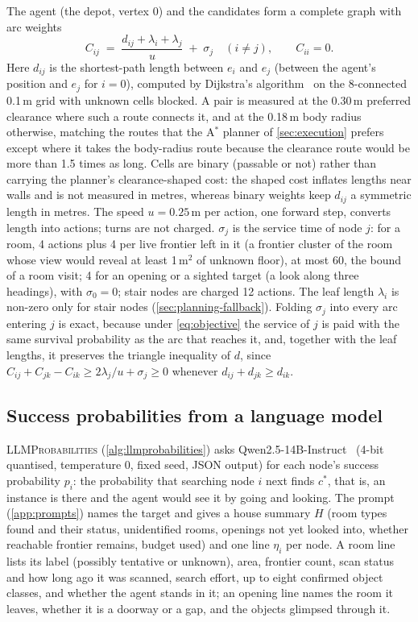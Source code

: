 \documentclass[10pt]{article}
\newcommand{\cstar}{c^{*}}
\begin{document}
The agent (the depot, vertex $0$) and the candidates form a complete graph with arc weights
\begin{equation}
  C_{ij} \;=\; \frac{d_{ij}+\lambda_i+\lambda_j}{u} \;+\; \sigma_j \quad (i\neq j), \qquad C_{ii}=0 .
  \label{eq:arccost}
\end{equation}
Here $d_{ij}$ is the shortest-path length between $e_i$ and $e_j$ (between the agent's position and $e_j$ for $i=0$), computed by Dijkstra's algorithm~\citep{dijkstra1959note} on the 8-connected 0.1\,m grid with unknown cells blocked. A pair is measured at the 0.30\,m preferred clearance where such a route connects it, and at the 0.18\,m body radius otherwise, matching the routes that the A$^*$ planner of \cref{sec:execution} prefers except where it takes the body-radius route because the clearance route would be more than 1.5 times as long. Cells are binary (passable or not) rather than carrying the planner's clearance-shaped cost: the shaped cost inflates lengths near walls and is not measured in metres, whereas binary weights keep $d_{ij}$ a symmetric length in metres. The speed $u=0.25$\,m per action, one forward step, converts length into actions; turns are not charged. $\sigma_j$ is the service time of node $j$: for a room, 4 actions plus 4 per live frontier left in it (a frontier cluster of the room whose view would reveal at least 1\,m$^2$ of unknown floor), at most 60, the bound of a room visit; 4 for an opening or a sighted target (a look along three headings), with $\sigma_0=0$; stair nodes are charged 12 actions. The leaf length $\lambda_i$ is non-zero only for stair nodes (\cref{sec:planning-fallback}). Folding $\sigma_j$ into every arc entering $j$ is exact, because under \cref{eq:objective} the service of $j$ is paid with the same survival probability as the arc that reaches it, and, together with the leaf lengths, it preserves the triangle inequality of $d$, since $C_{ij}+C_{jk}-C_{ik}\ge 2\lambda_j/u+\sigma_j\ge 0$ whenever $d_{ij}+d_{jk}\ge d_{ik}$.

\subsection{Success probabilities from a language model}
\label{sec:planning-oracle}

\textsc{LLMProbabilities} (\cref{alg:llmprobabilities}) asks Qwen2.5-14B-Instruct~\citep{yang2024qwen25} (4-bit quantised, temperature 0, fixed seed, JSON output) for each node's success probability $p_i$: the probability that searching node $i$ next finds $\cstar$, that is, an instance is there and the agent would see it by going and looking. The prompt (\cref{app:prompts}) names the target and gives a house summary $H$ (room types found and their status, unidentified rooms, openings not yet looked into, whether reachable frontier remains, budget used) and one line $\eta_i$ per node. A room line lists its label (possibly tentative or unknown), area, frontier count, scan status and how long ago it was scanned, search effort, up to eight confirmed object classes, and whether the agent stands in it; an opening line names the room it leaves, whether it is a doorway or a gap, and the objects glimpsed through it.
\end{document}

